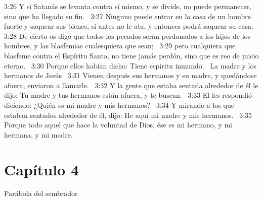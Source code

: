3:26 Y si Satanás se levanta contra sí mismo, y se divide, no puede permanecer, sino que ha llegado su fin.  
3:27 Ninguno puede entrar en la casa de un hombre fuerte y saquear sus bienes, si antes no le ata, y entonces podrá saquear su casa.  
3:28 De cierto os digo que todos los pecados serán perdonados a los hijos de los hombres, y las blasfemias cualesquiera que sean;  
3:29 pero cualquiera que blasfeme contra el Espíritu Santo, no tiene jamás perdón, sino que es reo de juicio eterno.  
3:30 Porque ellos habían dicho: Tiene espíritu inmundo.  
La madre y los hermanos de Jesús   
3:31 Vienen después sus hermanos y su madre, y quedándose afuera, enviaron a llamarle.  
3:32 Y la gente que estaba sentada alrededor de él le dijo: Tu madre y tus hermanos están afuera, y te buscan.  
3:33 El les respondió diciendo: ¿Quién es mi madre y mis hermanos?  
3:34 Y mirando a los que estaban sentados alrededor de él, dijo: He aquí mi madre y mis hermanos.  
3:35 Porque todo aquel que hace la voluntad de Dios, ése es mi hermano, y mi hermana, y mi madre.  
\section*{Capítulo 4}
Parábola del sembrador   

